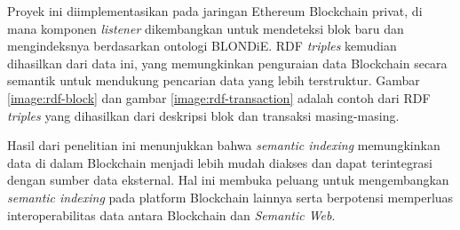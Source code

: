 Proyek ini diimplementasikan pada jaringan Ethereum Blockchain privat, di mana komponen \textit{listener} dikembangkan untuk mendeteksi blok baru dan mengindeksnya berdasarkan ontologi BLONDiE. RDF \textit{triples} kemudian dihasilkan dari data ini, yang memungkinkan penguraian data Blockchain secara semantik untuk mendukung pencarian data yang lebih terstruktur. Gambar \ref{image:rdf-block} dan gambar \ref{image:rdf-transaction} adalah contoh dari RDF \textit{triples} yang dihasilkan dari deskripsi blok dan transaksi masing-masing.

Hasil dari penelitian ini menunjukkan bahwa \textit{semantic indexing} memungkinkan data di dalam Blockchain menjadi lebih mudah diakses dan dapat terintegrasi dengan sumber data eksternal. Hal ini membuka peluang untuk mengembangkan \textit{semantic indexing} pada platform Blockchain lainnya serta berpotensi memperluas interoperabilitas data antara Blockchain dan \textit{Semantic Web}.